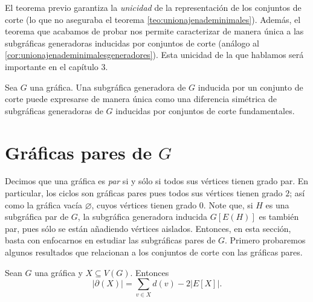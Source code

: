 El teorema previo garantiza la \textit{unicidad} de la representación de los conjuntos de corte (lo que no aseguraba el teorema \ref{teo:unionajenademinimales}). Además, el teorema que acabamos de probar nos permite caracterizar de manera única a las subgráficas generadoras inducidas por conjuntos de corte (análogo al \ref{cor:unionajenademinimalesgeneradores}). Esta unicidad de la que hablamos será importante en el capítulo 3.

\begin{cor}\label{cor:DifSimUnicaDeFundamentales}
Sea $G$ una gráfica. Una subgráfica generadora de $G$ inducida por un conjunto de corte puede expresarse de manera única como una diferencia simétrica de subgráficas generadoras de $G$ inducidas por conjuntos de corte fundamentales.
\end{cor}






\section{Gráficas pares de $G$}
Decimos que una gráfica es \textit{par}  si y sólo si todos sus vértices tienen grado par. En particular, los ciclos son gráficas pares pues todos sus vértices tienen grado $2$; así como la gráfica vacía $\varnothing$, cuyos vértices tienen grado $0$. Note que, si $H$ es una subgráfica par de $G$, la subgráfica generadora inducida $G[E(H)]$ es también par, pues sólo se están añadiendo vértices aislados. Entonces, en esta sección, basta con enfocarnos en estudiar las subgráficas pares de $G$. Primero probaremos algunos resultados que relacionan a los conjuntos de corte con las gráficas pares.  

\begin{lema} \label{lema1}
Sean $G$ una gráfica y $X \subseteq V(G)$. Entonces
$$
\big|\partial(X)\big|= \sum _{v \in X} d(v)- 2 \big |E[X]\big |.
$$
\end{lema}

